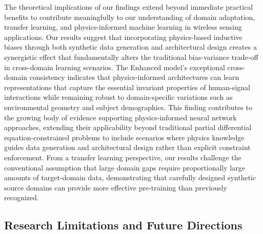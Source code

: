\documentclass[journal]{IEEEtran}
\begin{document}
The theoretical implications of our findings extend beyond immediate practical benefits to contribute meaningfully to our understanding of domain adaptation, transfer learning, and physics-informed machine learning in wireless sensing applications. Our results suggest that incorporating physics-based inductive biases through both synthetic data generation and architectural design creates a synergistic effect that fundamentally alters the traditional bias-variance trade-off in cross-domain learning scenarios. The Enhanced model's exceptional cross-domain consistency indicates that physics-informed architectures can learn representations that capture the essential invariant properties of human-signal interactions while remaining robust to domain-specific variations such as environmental geometry and subject demographics. This finding contributes to the growing body of evidence supporting physics-informed neural network approaches, extending their applicability beyond traditional partial differential equation-constrained problems to include scenarios where physics knowledge guides data generation and architectural design rather than explicit constraint enforcement. From a transfer learning perspective, our results challenge the conventional assumption that large domain gaps require proportionally large amounts of target-domain data, demonstrating that carefully designed synthetic source domains can provide more effective pre-training than previously recognized.

\subsection{Research Limitations and Future Directions}
\end{document}
